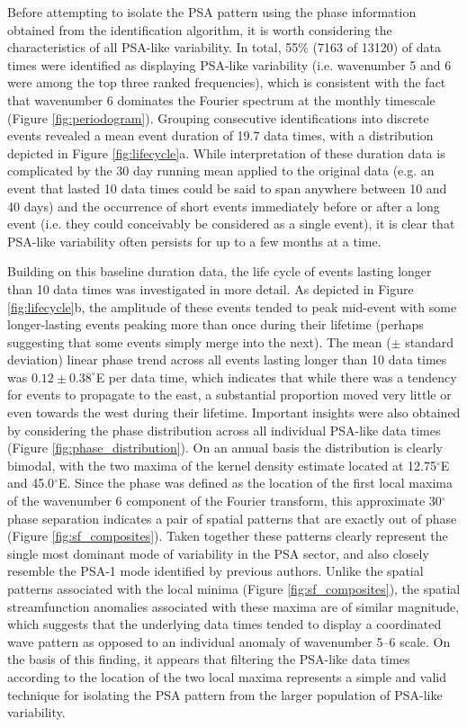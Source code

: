 Before attempting to isolate the PSA pattern using the phase information obtained from the identification algorithm, it is worth considering the characteristics of all PSA-like variability. In total, 55\% (7163 of 13120) of data times were identified as displaying PSA-like variability (i.e. wavenumber 5 and 6 were among the top three ranked frequencies), which is consistent with the fact that wavenumber 6 dominates the Fourier spectrum at the monthly timescale (Figure \ref{fig:periodogram}). Grouping consecutive identifications into discrete events revealed a mean event duration of 19.7 data times, with a distribution depicted in Figure \ref{fig:lifecycle}a. While interpretation of these duration data is complicated by the 30 day running mean applied to the original data (e.g. an event that lasted 10 data times could be said to span anywhere between 10 and 40 days) and the occurrence of short events immediately before or after a long event (i.e. they could conceivably be considered as a single event), it is clear that PSA-like variability often persists for up to a few months at a time.     

Building on this baseline duration data, the life cycle of events lasting longer than 10 data times was investigated in more detail. As depicted in Figure \ref{fig:lifecycle}b, the amplitude of these events tended to peak mid-event with some longer-lasting events peaking more than once during their lifetime (perhaps suggesting that some events simply merge into the next). The mean ($\pm$ standard deviation) linear phase trend across all events lasting longer than 10 data times was $0.12 \pm 0.38^{\circ}$E per data time, which indicates that while there was a tendency for events to propagate to the east, a substantial proportion moved very little or even towards the west during their lifetime. Important insights were also obtained by considering the phase distribution across all individual PSA-like data times (Figure \ref{fig:phase_distribution}). On an annual basis the distribution is clearly bimodal, with the two maxima of the kernel density estimate located at 12.75$^{\circ}$E and 45.0$^{\circ}$E. Since the phase was defined as the location of the first local maxima of the wavenumber 6 component of the Fourier transform, this approximate 30$^{\circ}$ phase separation indicates a pair of spatial patterns that are exactly out of phase (Figure \ref{fig:sf_composites}). Taken together these patterns clearly represent the single most dominant mode of variability in the PSA sector, and also closely resemble the PSA-1 mode identified by previous authors. Unlike the spatial patterns associated with the local minima (Figure \ref{fig:sf_composites}), the spatial streamfunction anomalies associated with these maxima are of similar magnitude, which suggests that the underlying data times tended to display a coordinated wave pattern as opposed to an individual anomaly of wavenumber 5--6 scale. On the basis of this finding, it appears that filtering the PSA-like data times according to the location of the two local maxima represents a simple and valid technique for isolating the PSA pattern from the larger population of PSA-like variability. 

